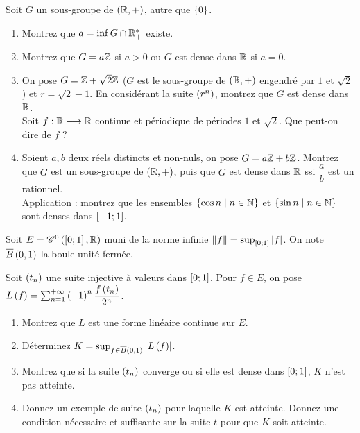 \begin{exosss}[Exercice 31]
Soit \(G\) un sous-groupe de \(\groupe{\R}\), autre que \(\left\lbrace0\right\rbrace\).

\begin{enumerate}
    \item Montrez que \(a=\inf G\cap\mathbb{R}_+^*\) existe. \\
    \item Montrez que \(G=a\mathbb{Z}\) si \(a>0\) ou \(G\) est dense dans \(\mathbb{R}\) si \(a=0\). \\
    \item On pose \(G=\mathbb{Z}+\sqrt{2}\mathbb{Z}\) (\(G\) est le sous-groupe de \(\groupe{\R}\) engendré par \(1\) et \(\sqrt{2}\)) et \(r=\sqrt{2}-1\). En considérant la suite \(\left(r^n\right)\), montrez que \(G\) est dense dans \(\mathbb{R}\). \\ Soit \(f:\mathbb{R}\longrightarrow\mathbb{R}\) continue et périodique de périodes \(1\) et \(\sqrt{2}\). Que peut-on dire de \(f\) ? \\
    \item Soient \(a,b\) deux réels distincts et non-nuls, on pose \(G=a\mathbb{Z}+b\mathbb{Z}\). Montrez que \(G\) est un sous-groupe de \(\groupe{\R}\), puis que \(G\) est dense dans \(\mathbb{R}\) ssi \(\dfrac{a}{b}\) est un rationnel. \\ Application : montrez que les ensembles \(\left\lbrace\cos n\;\middle|\; n\in\mathbb{N}\right\rbrace\) et \(\left\lbrace\sin n\;\middle|\; n\in\mathbb{N}\right\rbrace\) sont denses dans \(\left[-1;1\right]\).
\end{enumerate}
\end{exosss}



\begin{exosss}[Exercice 32]
Soit \(E=\mathscr{C}^{0}\left(\left[0;1\right],\mathbb{R}\right)\) muni de la norme infinie \(\norme{f}=\sup_{\intervii{0}{1}}\abs{f}\). On note \(\overline{B}\left(0,1\right)\) la boule-unité fermée.

Soit \(\left(t_n\right)\) une suite injective à valeurs dans \(\left[0;1\right]\). Pour \(f\in E\), on pose \(L\left(f\right)=\sum_{n=1}^{+\infty}\left(-1\right)^n\dfrac{f\left(t_n\right)}{2^n}\).

\begin{enumerate}
    \item Montrez que \(L\) est une forme linéaire continue sur \(E\). \\
    \item Déterminez \(K=\sup_{f\in\overline{B}\left(0,1\right)}\left\lvert L\left(f\right)\right\rvert\). \\
    \item Montrez que si la suite \(\left(t_n\right)\) converge ou si elle est dense dans \(\left[0;1\right]\), \(K\) n'est pas atteinte. \\
    \item Donnez un exemple de suite \(\left(t_n\right)\) pour laquelle \(K\) est atteinte. Donnez une condition nécessaire et suffisante sur la suite \(t\) pour que \(K\) soit atteinte.
\end{enumerate}
\end{exosss}



